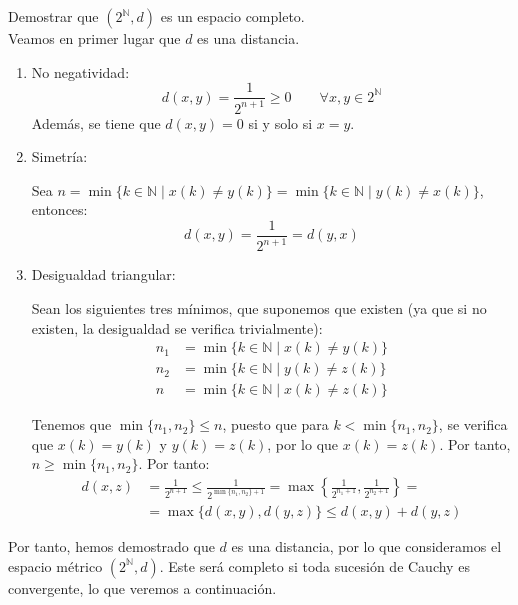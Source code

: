 \begin{ejercicio}
    Demostrar que $(2^\mathbb{N}, d)$ es un espacio completo. \\

    Veamos en primer lugar que $d$ es una distancia.
    \begin{enumerate}
        \item No negatividad:
            \begin{equation*}
                d(x,y) = \frac{1}{2^{n+1}} \geq 0 \qquad \forall x,y\in 2^\mathbb{N}
            \end{equation*}
            Además, se tiene que $d(x,y) = 0$ si y solo si $x = y$.

        \item Simetría:
        
            Sea $n=\min\{k\in \mathbb{N} \mid x(k) \neq y(k)\}=\min\{k\in \mathbb{N} \mid y(k) \neq x(k)\}$, entonces:
            \begin{equation*}
                d(x,y) = \frac{1}{2^{n+1}} = d(y,x)
            \end{equation*}

        \item Desigualdad triangular:
        
            Sean los siguientes tres mínimos, que suponemos que existen (ya que si no existen, la desigualdad se verifica trivialmente):
            \begin{align*}
                n_1 &= \min\{k\in \mathbb{N} \mid x(k) \neq y(k)\} \\
                n_2 &= \min\{k\in \mathbb{N} \mid y(k) \neq z(k)\} \\
                n &= \min\{k\in \mathbb{N} \mid x(k) \neq z(k)\}
            \end{align*}

            Tenemos que $\min\{n_1,n_2\} \leq n$, puesto que para $k<\min\{n_1,n_2\}$, se verifica que $x(k) = y(k)$ y $y(k) = z(k)$, por lo que $x(k) = z(k)$. Por tanto, $n\geq \min\{n_1,n_2\}$. Por tanto:
            \begin{align*}
                d(x,z) &= \frac{1}{2^{n+1}} \leq \frac{1}{2^{\min\{n_1,n_2\}+1}} = \max\left\{\frac{1}{2^{n_1+1}},\frac{1}{2^{n_2+1}}\right\} =\\&= \max\{d(x,y),d(y,z)\}\leq d(x,y) + d(y,z)
            \end{align*}
    \end{enumerate}

    Por tanto, hemos demostrado que $d$ es una distancia, por lo que consideramos el espacio métrico $(2^\mathbb{N},d)$. Este será completo si toda sucesión de Cauchy es convergente, lo que veremos a continuación.\\


\end{ejercicio}
